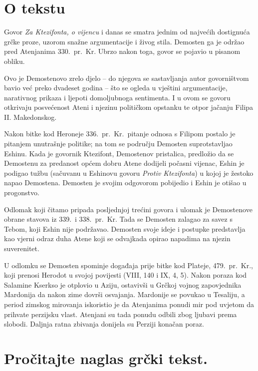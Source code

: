 
\section*{O tekstu}

Govor \textit{Za Ktezifonta, o vijencu} i danas se smatra jednim od najvećih dostignuća grčke proze, uzorom snažne argumentacije i živog stila. Demosten ga je održao pred Atenjanima 330.\ pr.~Kr. Ubrzo nakon toga, govor se pojavio u pisanom obliku.

Ovo je Demostenovo zrelo djelo – do njegova se sastavljanja autor govorništvom bavio već preko dvadeset godina – što se ogleda u vještini argumentacije, narativnog prikaza i ljepoti domoljubnoga sentimenta. I u ovom se govoru otkrivaju posvećenost Ateni i njezinu političkom opstanku te otpor jačanju Filipa II. Makedonskog. 

Nakon bitke kod Heroneje 336.\ pr.~Kr.\ pitanje odnosa s Filipom postalo je pitanjem unutrašnje politike; na tom se području Demosten suprotstavljao Eshinu. Kada je govornik Ktezifont, Demostenov pristalica, predložio da se Demostenu za predanost općem dobru Atene dodijeli počasni vijenac, Eshin je podigao tužbu (sačuvanu u Eshinovu govoru \textit{Protiv Ktezifonta}) u kojoj je žestoko napao Demostena. Demosten je svojim odgovorom pobijedio i Eshin je otišao u progonstvo.

Odlomak koji čitamo pripada posljednjoj trećini govora i ulomak je Demostenove obrane stavova iz 339.\ i 338.\ pr.~Kr. Tada se Demosten zalagao za savez s Tebom, koji Eshin nije podržavao. Demosten svoje ideje i postupke predstavlja kao vjerni odraz duha Atene koji se odvajkada opirao napadima na njezin suverenitet.

U odlomku se Demosten spominje događaja prije bitke kod Plateje, 479.\ pr.~Kr., koji prenosi Herodot u svojoj povijesti (VIII, 140 i IX, 4, 5). Nakon poraza kod Salamine Kserkso je otplovio u Aziju, ostavivši u Grčkoj vojnog zapovjednika Mardonija da nakon zime dovrši osvajanja. Mardonije se povukao u Tesaliju, a period zimskog mirovanja iskoristio je da Atenjanima ponudi mir pod uvjetom da prihvate perzijsku vlast. Atenjani su tada ponudu odbili zbog ljubavi prema slobodi. Daljnja ratna zbivanja donijela su Perziji konačan poraz.


\section*{Pročitajte naglas grčki tekst.}

